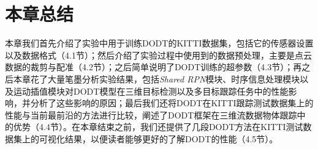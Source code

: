 

\section{本章总结}
\label{exp_conclusion}
本章我们首先介绍了实验中用于训练DODT的KITTI数据集，包括它的传感器设置以及数据格式（4.1节）；然后介绍了实验过程中使用到的数据预处理，主要是点云数据的裁剪与配准（4.2节）；之后简单说明了DODT训练的超参数（4.3节）；再之后本章花了大量笔墨分析实验结果，包括\textit{Shared RPN}模块、时序信息处理模块以及运动插值模块对DODT模型在三维目标检测以及多目标跟踪任务中的性能影响，并分析了这些影响的原因；最后我们还将DODT在KITTI跟踪测试数据集上的性能与当前最前沿的方法进行比较，阐述了DODT框架在三维流数据物体跟踪中的优势（4.4节）。在本章结束之前，我们还提供了几段DODT方法在KITTI测试数据集上的可视化结果，以便读者能够更好的了解DODT的性能（4.5节）。

\ifprint
	\newpage
	\thispagestyle{empty}
	\mbox{}
	
	\clearpage
	\setcounter{page}{10}
\fi